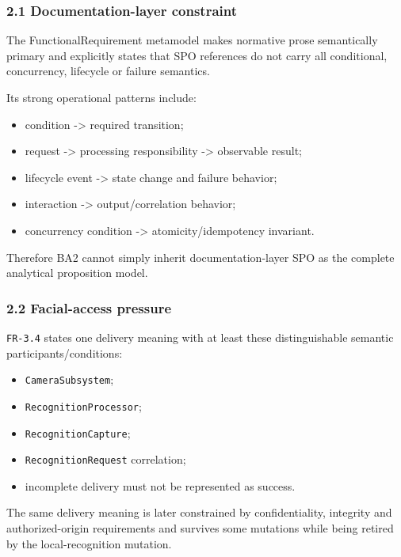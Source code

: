 \documentclass[
  10pt,
  letterpaper,
]{article}
\providecommand{\tightlist}{%
  \setlength{\itemsep}{0pt}\setlength{\parskip}{0pt}}
\begin{document}
\subsubsection{2.1 Documentation-layer
constraint}\label{documentation-layer-constraint}

The FunctionalRequirement metamodel makes normative prose semantically
primary and explicitly states that SPO references do not carry all
conditional, concurrency, lifecycle or failure semantics.

Its strong operational patterns include:

\begin{itemize}
\tightlist
\item
  condition -\textgreater{} required transition;
\item
  request -\textgreater{} processing responsibility -\textgreater{}
  observable result;
\item
  lifecycle event -\textgreater{} state change and failure behavior;
\item
  interaction -\textgreater{} output/correlation behavior;
\item
  concurrency condition -\textgreater{} atomicity/idempotency invariant.
\end{itemize}

Therefore BA2 cannot simply inherit documentation-layer SPO as the
complete analytical proposition model.

\subsubsection{2.2 Facial-access pressure}\label{facial-access-pressure}

\texttt{FR-3.4} states one delivery meaning with at least these
distinguishable semantic participants/conditions:

\begin{itemize}
\tightlist
\item
  \texttt{CameraSubsystem};
\item
  \texttt{RecognitionProcessor};
\item
  \texttt{RecognitionCapture};
\item
  \texttt{RecognitionRequest} correlation;
\item
  incomplete delivery must not be represented as success.
\end{itemize}

The same delivery meaning is later constrained by confidentiality,
integrity and authorized-origin requirements and survives some mutations
while being retired by the local-recognition mutation.
\end{document}
